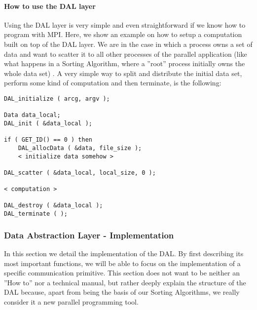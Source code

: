 \paragraph{How to use the DAL layer} Using the DAL layer is very simple and even straightforward if we know how to program with MPI. Here, we show an example on how to setup a computation built on top of the DAL layer. We are in the case in which a process owns a set of data and want to scatter it to all other processes of the parallel application (like what happens in a Sorting Algorithm, where a ''root'' process initially owns the whole data set) . A very simple way to split and distribute the initial data set, perform some kind of computation and then terminate, is the following:
\begin{lstlisting}
DAL_initialize ( arcg, argv );

Data data_local;
DAL_init ( &data_local );

if ( GET_ID() == 0 ) then
	DAL_allocData ( &data, file_size );
	< initialize data somehow >
	
DAL_scatter ( &data_local, local_size, 0 );

< computation >

DAL_destroy ( &data_local );	
DAL_terminate ( );
\end{lstlisting}


\subsubsection{Data Abstraction Layer - Implementation}
\label{DAL-impl}
In this section we detail the implementation of the DAL. By first describing its most important functions, we will be able to focus on the implementation of a specific communication primitive. This section does not want to be neither an ''How to'' nor a technical manual, but rather deeply explain the structure of the DAL because, apart from being the basis of our Sorting Algorithms, we really consider it a new parallel programming tool.

